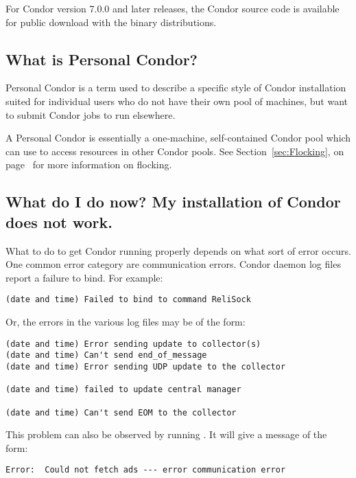 For Condor version 7.0.0 and later releases,
the Condor source code is available for 
public download with the binary distributions.

\subsection*{What is Personal Condor?}

Personal Condor is a term used to describe a specific style of Condor
installation suited for individual users who do not have their own
pool of machines, but want to submit Condor jobs to run elsewhere.

A Personal Condor is essentially a one-machine, self-contained Condor
pool which can use  to access resources in other Condor
pools.
See Section~\ref{sec:Flocking}, on page~\pageref{sec:Flocking} for
more information on flocking.


\subsection*{What do I do now? My installation of Condor does not work.}

What to do to get Condor running properly depends on what sort of
error occurs. 
One common error category are communication errors.
Condor daemon log files report a failure to bind.
For example:

\footnotesize
\begin{verbatim}
(date and time) Failed to bind to command ReliSock
\end{verbatim}
\normalsize

Or, the errors in the various log files may be of the form:

\footnotesize
\begin{verbatim}
(date and time) Error sending update to collector(s)
(date and time) Can't send end_of_message
(date and time) Error sending UDP update to the collector

(date and time) failed to update central manager

(date and time) Can't send EOM to the collector
\end{verbatim}
\normalsize

This problem can also be observed by running .
It will give a message of the form:
\footnotesize
\begin{verbatim}
Error:  Could not fetch ads --- error communication error
\end{verbatim}
\normalsize

